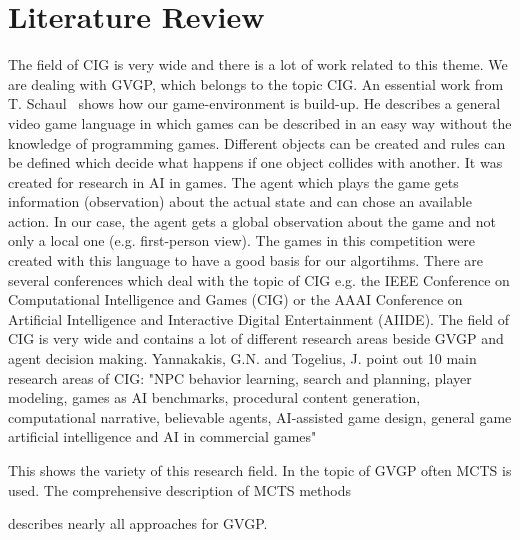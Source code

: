 \section{Literature Review} \label{sec:lit}

The field of \ac{CIG} is very wide and there is a lot of work related  to this theme. We are dealing with \ac{GVGP}, which belongs to the topic \ac{CIG}. 
An essential work from T. Schaul~\cite{schaul2013pyvgdl} shows how our game-environment is build-up. He describes a general video game language in which games can be described in an easy way without the knowledge of programming games. Different objects can be created and rules can be defined which decide what happens if one object collides with another. It was created for research in \ac{AI} in games. The agent which plays the game gets information (observation) about the actual state and can chose an available action. In our case, the agent gets a global observation about the game and not only a local one (e.g. first-person view). The games in this competition were created with this language to have a good basis for our algortihms.
There are several conferences which deal with the topic of \ac{CIG} e.g. the IEEE Conference on Computational Intelligence and Games (CIG) or the AAAI Conference on Artificial Intelligence and Interactive Digital Entertainment (AIIDE). The field of \ac{CIG} is very wide and contains a lot of different research areas beside \ac{GVGP} and agent decision making. Yannakakis, G.N. and Togelius, J. point out 10 main research areas of \ac{CIG}: "NPC behavior learning, search and planning, player modeling, games as AI benchmarks, procedural content generation, computational narrative, believable agents, AI-assisted game design, general game artificial intelligence and AI in commercial games"


This shows the variety of this research field. In the topic of \ac{GVGP} often \ac{MCTS} is used. The comprehensive description of \ac{MCTS} methods 


describes nearly all approaches for \ac{GVGP}. 